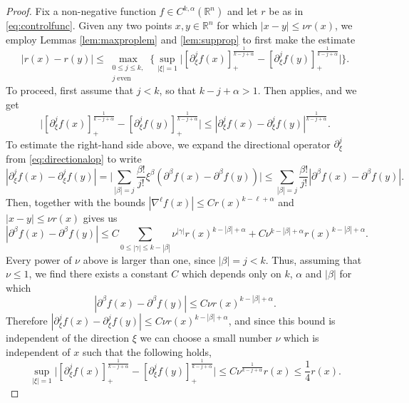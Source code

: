 \documentclass[oneside,hidelinks,indentfirst,10pt]{book}
\begin{document}
\begin{proof}
Fix a non-negative function \(f\in C^{k,\alpha}(\mathbb{R}^n)\) and let \(r\) be as in \eqref{eq:controlfunc}. Given any two points \(x,y\in\mathbb{R}^n\) for which \(|x-y|\leq \nu r(x)\), we employ Lemmas \ref{lem:maxproplem} and \ref{lem:supprop} to first make the estimate
\begin{equation}\label{eq:intermed4}
    |r(x)-r(y)|\leq \max_{\substack{0\leq j\leq k,\\j\;\mathrm{even}}}\big\{\sup_{|\xi|=1}\big|[\partial^j_\xi f(x)]_+^\frac{1}{k-j+\alpha}-[\partial^j_\xi f(y)]_+^\frac{1}{k-j+\alpha}\big|\big\}.
\end{equation}
To proceed, first assume that \(j<k\), so that \(k-j+\alpha> 1\). Then  applies, and we get
\[
    \big|[\partial^j_\xi f(x)]_+^\frac{1}{k-j+\alpha}-[\partial^j_\xi f(y)]_+^\frac{1}{k-j+\alpha}\big|\leq |\partial^j_\xi f(x)-\partial^j_\xi f(y)|^\frac{1}{k-j+\alpha}.
\]
To estimate the right-hand side above, we expand the directional operator \(\partial_\xi^j\) from \eqref{eq:directionalop} to write
\[
    |\partial^j_\xi f(x)-\partial^j_\xi f(y)|=\bigg|\sum_{|\beta|=j}\frac{\beta!}{j!}\xi^\beta(\partial^\beta f(x)-\partial^\beta f(y))\bigg|\leq \sum_{|\beta|=j}\frac{\beta!}{j!}|\partial^\beta f(x)-\partial^\beta f(y)|.
\]
Then,  together with the bounds \(|\nabla^\ell f(x)|\leq Cr(x)^{k-\ell+\alpha}\) and \(|x-y|\leq \nu r(x)\) gives us
\[
    |\partial^\beta f(x)-\partial^\beta f(y)|\leq C\sum_{0\leq |\gamma|\leq k-|\beta|}\nu^{|\gamma|}r(x)^{k-|\beta|+\alpha}+C\nu^{k-|\beta|+\alpha}r(x)^{k-|\beta|+\alpha}.
\]
Every power of \(\nu\) above is larger than one, since \(|\beta|=j<k\). Thus, assuming that \(\nu\leq 1\), we find there exists a constant \(C\) which depends only on \(k\), \(\alpha\) and \(|\beta|\) for which
\begin{equation}\label{eq:omegaeqn}
    |\partial^\beta f(x)-\partial^\beta f(y)|\leq C\nu r(x)^{k-|\beta|+\alpha}.
\end{equation}
Therefore \(|\partial^j_\xi f(x)-\partial^j_\xi f(y)|\leq C\nu r(x)^{k-|\beta|+\alpha}\), and since this bound is independent of the direction \(\xi\) we can choose a small number \(\nu\) which is independent of \(x\) such that the following holds,
\[
    \sup_{|\xi|=1}\big|[\partial^j_\xi f(x)]_+^\frac{1}{k-j+\alpha}-[\partial^j_\xi f(y)]_+^\frac{1}{k-j+\alpha}\big|\leq  C\nu^\frac{1}{k-j+\alpha}r(x)\leq \frac{1}{4}r(x).
\]



\end{proof}
\end{document}
